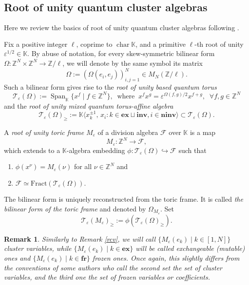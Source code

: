 \documentclass[11pt]{amsart}
\theoremstyle{plain}
\newtheorem{remark}[theorem]{Remark}
\newcommand \bre[1] { \begin{remark}\label{r#1}\rm }
\newcommand {\ere} { \end{remark} }
\newcommand \reref[1]{Remark \ref{r#1}}
\def \KK {{\mathbb C}}
\def \KK {{\mathbb K}}
\def \Zset {{\mathbb Z}}
\newcommand \ex {{\mathbf{ex}}}
\newcommand \fr {{\mathbf{fr}}}
\newcommand \inv {{\mathbf{inv}}}
\newcommand \ninv {{\mathbf{ninv}}}
\def \TT {{\mathcal{T}}}
\def \FF {{\mathcal{F}}}
\def \Om {\Omega}
\def \ep {\varepsilon}
\def \hra {\hookrightarrow}
\def \rcor {\rangle}
\def \lcor {\langle}
\DeclareMathOperator \Span { {\mathrm{Span}} }
\DeclareMathOperator \charr { {\mathrm{char}} }
\newcommand \Fract {{\mathrm{Fract}}}
\begin{document}
\subsection{Root of unity quantum cluster algebras}
\label{2.2}
Here we review the basics of root of unity quantum cluster algebras following \cite{NTY2}.

Fix a positive integer $\ell$, coprime to $\charr \KK$, and a primitive $\ell$-th root of unity $\ep^{1/2} \in \KK$. By abuse of notation, for every skew-symmetric bilinear form $\Omega : \Zset^N \times \Zset^N \to \Zset/\ell$, we will denote by the same symbol its matrix 
\[
\Omega:=(\Omega(e_i,e_j))_{i,j=1}^N \in M_N(\Zset/\ell). 
\]
Such a bilinear form gives rise to the {\em root of unity based quantum torus}
\begin{equation}
\label{Tep}
\TT_\ep(\Omega) := \Span_{\KK} \{ x^f \mid f \in \Zset^N \}, \; \; 
\mbox{where} \; \; x^f x^g = \ep^{\Omega(f,g)/2} x^{f+g}, \; \; \forall f, g \in \Zset^N
\end{equation}
and the {\em{root of unity mixed quantum torus-affine algebra}}
\[
\TT_\ep(\Om)_{\geq} :=\KK \lcor x_k^{\pm 1}, \, x_i  :  k \in \ex \sqcup \inv,  i \in \ninv \rcor \subset \TT_\ep(\Om).
\]

A {\em{root of unity toric frame}} $M_\ep$ of a division algebra $\FF$ over $\KK$ is a map 
\[
M_\ep : \Zset^N \to \FF,
\]
which extends to a $\KK$-algebra embedding $\phi: \TT_\ep(\Omega) \hra \FF$ such that
\begin{enumerate}
    \item $\phi(x^\nu)=M_\ep(\nu)$ for all $\nu \in \Zset^N$ and 
    \item $\FF \simeq \Fract \left( \TT_\ep(\Omega) \right)$.
\end{enumerate}
The bilinear form is uniquely reconstructed from the toric frame. It is called {\em{the bilinear form of the toric frame}} and denoted by $\Omega_{M_\ep}$. Set 
\[
\TT_\ep(M_\ep)_{\geq} := \phi (\TT_\ep(\Om)_{\geq}).
\]

\bre{cv2} Similarly to \reref{cv}, we will call $\{M_\ep(e_k) \mid k \in [1,N] \}$ {\em{cluster variables}}, while $\{M_\ep(e_k) \mid k \in \ex\}$ will be called {\em{exchangeable}} ({\em{mutable}}) ones and $\{M_\ep(e_k) \mid k \in \fr\}$ frozen ones. Once again, this slightly differs from the conventions of some authors who call the second set the set of cluster variables, and the third one the set of frozen variables or coefficients. 
\ere
\end{document}
